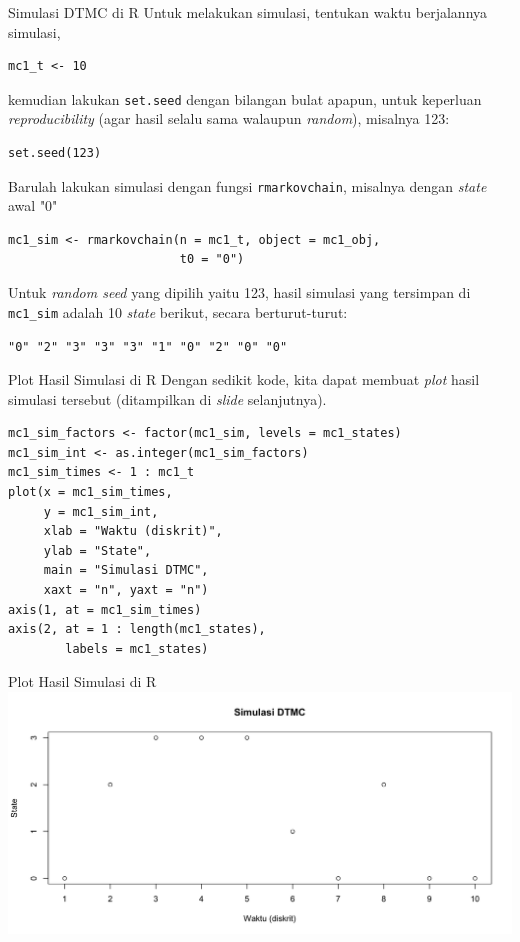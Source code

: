 \documentclass{beamer}
\begin{document}
\begin{frame}[fragile]{Simulasi DTMC di R}
    Untuk melakukan simulasi, tentukan waktu berjalannya simulasi,

\begin{verbatim}
mc1_t <- 10    
\end{verbatim}

    kemudian lakukan \verb|set.seed| dengan bilangan bulat apapun, untuk keperluan \textit{reproducibility} (agar hasil selalu sama walaupun \textit{random}), misalnya 123:

\begin{verbatim}
set.seed(123)
\end{verbatim}

    Barulah lakukan simulasi dengan fungsi \verb|rmarkovchain|, misalnya dengan \textit{state} awal "0"

\begin{verbatim}
mc1_sim <- rmarkovchain(n = mc1_t, object = mc1_obj,
                        t0 = "0")
\end{verbatim}

Untuk \textit{random seed} yang dipilih yaitu 123, hasil simulasi yang tersimpan di \verb|mc1_sim| adalah 10 \textit{state} berikut, secara berturut-turut:

\verb|"0" "2" "3" "3" "3" "1" "0" "2" "0" "0"|

\end{frame}

\begin{frame}[fragile]{Plot Hasil Simulasi di R}
    Dengan sedikit kode, kita dapat membuat \textit{plot} hasil simulasi tersebut (ditampilkan di \textit{slide} selanjutnya).

\begin{verbatim}
mc1_sim_factors <- factor(mc1_sim, levels = mc1_states)
mc1_sim_int <- as.integer(mc1_sim_factors)
mc1_sim_times <- 1 : mc1_t
plot(x = mc1_sim_times,
     y = mc1_sim_int,
     xlab = "Waktu (diskrit)",
     ylab = "State",
     main = "Simulasi DTMC",
     xaxt = "n", yaxt = "n")
axis(1, at = mc1_sim_times)
axis(2, at = 1 : length(mc1_states),
        labels = mc1_states)
\end{verbatim}
\end{frame}

\begin{frame}{Plot Hasil Simulasi di R}
    \includegraphics[scale=0.45]{gambar/contoh_dtmc_simulasi.png}
\end{frame}
\end{document}
